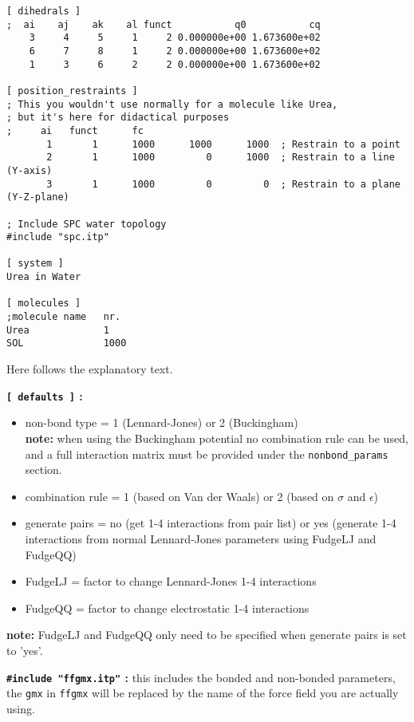 {\begin{verbatim}
[ dihedrals ]
;  ai    aj    ak    al funct           q0           cq
    3     4     5     1     2 0.000000e+00 1.673600e+02 
    6     7     8     1     2 0.000000e+00 1.673600e+02 
    1     3     6     2     2 0.000000e+00 1.673600e+02 
 
[ position_restraints ]
; This you wouldn't use normally for a molecule like Urea,
; but it's here for didactical purposes
;     ai   funct      fc
       1       1      1000      1000      1000  ; Restrain to a point
       2       1      1000         0      1000  ; Restrain to a line (Y-axis)
       3       1      1000         0         0  ; Restrain to a plane (Y-Z-plane)

; Include SPC water topology
#include "spc.itp"

[ system ]
Urea in Water

[ molecules ]
;molecule name   nr.
Urea             1
SOL              1000
\end{verbatim}}

Here follows the explanatory text.

{\bf {\tt [~defaults~]} :}
\begin{itemize}
\item non-bond type = 1 (Lennard-Jones) or 2 (Buckingham)\\
{\bf note:} when using the Buckingham potential no combination rule can
be used, and a full interaction matrix must be provided under the 
{\tt nonbond\_params} section.
\item combination rule = 1 (based on Van der Waals) or 2 (based on
$\sigma$ and $\epsilon$)
\item generate pairs = no (get 1-4 interactions from pair list) or yes
(generate 1-4 interactions from normal Lennard-Jones parameters using
FudgeLJ and FudgeQQ)
\item FudgeLJ = factor to change Lennard-Jones 1-4 interactions
\item FudgeQQ = factor to change electrostatic 1-4 interactions
\end{itemize}
{\bf note:} FudgeLJ and FudgeQQ only need to be specified when
generate pairs is set to 'yes'.



{\bf {\tt \#include "ffgmx.itp"} :} this includes the bonded and
non-bonded {\gromacs} parameters, the {\tt gmx} in {\tt ffgmx} will be
replaced by the name of the force field you are actually using.

